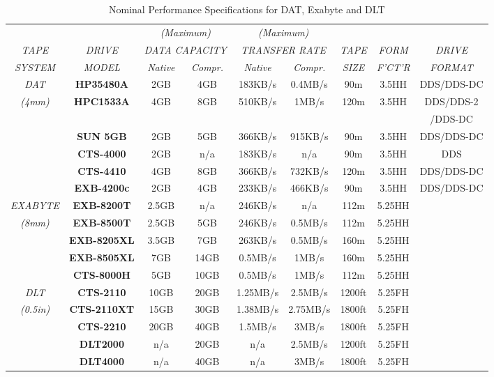 \begin{table}[h]
\begin{scriptsize}
\begin {center}
\begin{tabular}{||c|c|c|c|c|c|c|c|c||} \hline
& & \multicolumn{2}{c|}{{\em (Maximum)}} &
\multicolumn{2}{c|}{{\em (Maximum)}} & & & \\
{\em TAPE} & {\em DRIVE} & \multicolumn{2}{c|}{{\em DATA CAPACITY}}
& \multicolumn{2}{c|}{{\em TRANSFER RATE}}
& {\em TAPE} & {\em FORM} & {\em DRIVE} \\ \cline{3-6}
{\em SYSTEM} & {\em MODEL} & {\em Native} & {\em Compr.}
& {\em Native} & {\em Compr.} & {\em SIZE} & {\em F'CT'R}
& {\em FORMAT} \\ \hline
{\em DAT} & {\bf HP35480A} & 2GB & 4GB & 183KB/s & 0.4MB/s
& 90m & 3.5HH & DDS/DDS-DC \\
{\em (4mm)} & {\bf HPC1533A} & 4GB & 8GB & 510KB/s & 1MB/s
& 120m & 3.5HH & DDS/DDS-2 \\
& & & & & & & & /DDS-DC \\
& {\bf SUN 5GB} & 2GB & 5GB & 366KB/s & 915KB/s
& 90m & 3.5HH & DDS/DDS-DC \\
& {\bf CTS-4000} & 2GB & n/a & 183KB/s & n/a
& 90m & 3.5HH & DDS \\
& {\bf CTS-4410} & 4GB & 8GB & 366KB/s & 732KB/s
& 120m & 3.5HH & DDS/DDS-DC \\
& {\bf EXB-4200c} & 2GB & 4GB & 233KB/s & 466KB/s
& 90m & 3.5HH & DDS/DDS-DC \\ \hline \hline
{\em EXABYTE} & {\bf EXB-8200T} & 2.5GB & n/a & 246KB/s & n/a
& 112m & 5.25HH & \\
{\em (8mm)} & {\bf EXB-8500T} & 2.5GB & 5GB & 246KB/s & 0.5MB/s
& 112m & 5.25HH & \\
& {\bf EXB-8205XL} & 3.5GB & 7GB & 263KB/s & 0.5MB/s
& 160m & 5.25HH & \\
& {\bf EXB-8505XL} & 7GB & 14GB & 0.5MB/s & 1MB/s
& 160m & 5.25HH & \\
& {\bf CTS-8000H} & 5GB & 10GB & 0.5MB/s & 1MB/s
& 112m & 5.25HH & \\ \hline \hline
{\em DLT} & {\bf CTS-2110} & 10GB & 20GB & 1.25MB/s & 2.5MB/s
& 1200ft & 5.25FH & \\
{\em (0.5in)} & {\bf CTS-2110XT} & 15GB & 30GB & 1.38MB/s & 2.75MB/s
& 1800ft & 5.25FH & \\
& {\bf CTS-2210} & 20GB & 40GB & 1.5MB/s & 3MB/s
& 1800ft & 5.25FH & \\
& {\bf DLT2000} & n/a & 20GB & n/a & 2.5MB/s
& 1200ft & 5.25FH & \\
& {\bf DLT4000} & n/a & 40GB & n/a & 3MB/s
& 1800ft & 5.25FH & \\ \hline
\end{tabular}
\caption {Nominal Performance Specifications for DAT, Exabyte and DLT}
\end{center}
\end{scriptsize}
\end{table}

